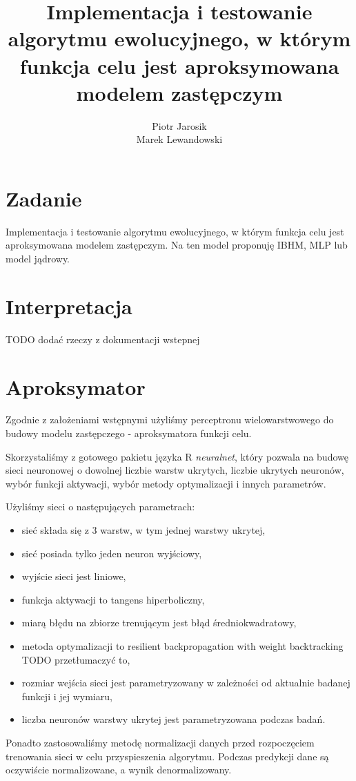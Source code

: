 \documentclass[12pt, a4paper]{article}
\title{\textbf{Implementacja i testowanie algorytmu ewolucyjnego, w którym funkcja celu jest 
aproksymowana modelem zastępczym}}
\author{Piotr Jarosik \\ Marek Lewandowski}
\date{}
\begin{document}
\maketitle

\section{Zadanie}
Implementacja i testowanie algorytmu ewolucyjnego, w którym funkcja celu jest aproksymowana modelem 
zastępczym. Na ten model proponuję IBHM, MLP lub model jądrowy.
\section{Interpretacja}

TODO dodać rzeczy z dokumentacji wstepnej

\section{Aproksymator}
Zgodnie z założeniami wstępnymi użyliśmy perceptronu wielowarstwowego do 
budowy modelu zastępczego - aproksymatora funkcji celu. 

Skorzystaliśmy z gotowego pakietu języka R \emph{neuralnet}, który pozwala na budowę 
sieci neuronowej o dowolnej liczbie warstw ukrytych, liczbie ukrytych neuronów, wybór funkcji aktywacji, 
wybór metody optymalizacji i innych parametrów.

Użyliśmy sieci o następujących parametrach:
\begin{itemize}
\item sieć składa się z 3 warstw, w tym jednej warstwy ukrytej,
\item sieć posiada tylko jeden neuron wyjściowy,
\item wyjście sieci jest liniowe,
\item funkcja aktywacji to tangens hiperboliczny,
\item miarą błędu na zbiorze trenującym jest błąd średniokwadratowy,
\item metoda optymalizacji to resilient backpropagation with weight backtracking TODO przetłumaczyć to,
\item rozmiar wejścia sieci jest parametryzowany w zależności od aktualnie badanej funkcji i jej wymiaru,
\item liczba neuronów warstwy ukrytej jest parametryzowana podczas badań.
\end{itemize}

Ponadto zastosowaliśmy metodę normalizacji danych przed rozpoczęciem trenowania sieci w celu przyspieszenia algorytmu. Podczas predykcji dane są oczywiście normalizowane, a wynik denormalizowany.

\nocite{*}


\end{document}
